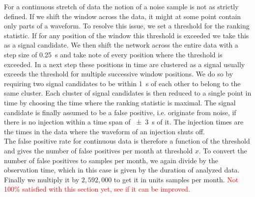 For a continuous stretch of data the notion of a noise sample is not as strictly defined. If we shift the window across the data, it might at some point contain only parts of a waveform. To resolve this issue, we set a threshold for the ranking statistic. If for any position of the window this threshold is exceeded we take this as a signal candidate. We then shift the network across the entire data with a step size of \SI{0.25}{\s} and take note of every position where the threshold is exceeded. In a next step these positions in time are clustered as a signal usually exceeds the threshold for multiple successive window positions. We do so by requiring two signal candidates to be within \SI{1}{\s} of each other to belong to the same cluster. Each cluster of signal candidates is then reduced to a single point in time by choosing the time where the ranking statistic is maximal. The signal candidate is finally assumed to be a false positive, i.e. originate from noise, if there is no injection within a time span of \SI{\pm 3}{\s} of it. The injection times are the times in the data where the waveform of an injection shuts off.\\
The false positive rate for continuous data is therefore a function of the threshold and gives the number of false positives per month at threshold $x$. To convert the number of false positives to samples per month, we again divide by the observation time, which in this case is given by the duration of analyzed data. Finally we multiply it by $2,592,000$ to get it in units samples per month. \textcolor{red}{Not 100\% satisfied with this section yet, see if it can be improved.}

